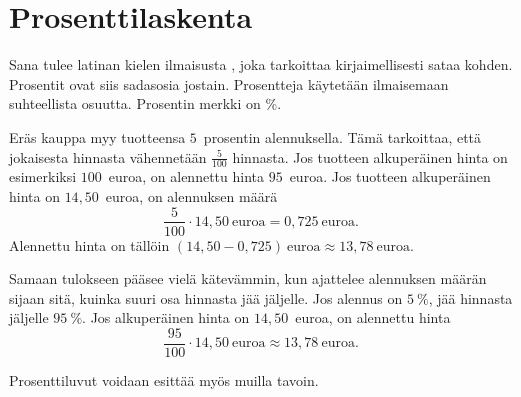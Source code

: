 \section{Prosenttilaskenta}

Sana  tulee latinan kielen ilmaisusta ,
joka tarkoittaa kirjaimellisesti sataa kohden. 
Prosentit ovat siis sadasosia jostain.
Prosentteja käytetään ilmaisemaan suhteellista osuutta.
Prosentin merkki on \%.


\begin{esimerkki}
Eräs kauppa myy tuotteensa $5$~prosentin alennuksella. Tämä tarkoittaa, että jokaisesta hinnasta vähennetään $\frac{5}{100}$ hinnasta. Jos tuotteen alkuperäinen hinta on esimerkiksi $100$~euroa, on alennettu hinta $95$~euroa. Jos tuotteen alkuperäinen hinta on $14,50$~euroa, on alennuksen määrä
\[
	\frac{5}{100} \cdot 14,50~\text{euroa} = 0,725~\text{euroa}.
\]
Alennettu hinta on tällöin $(14,50 - 0,725)~\text{euroa} \approx 13,78~\text{euroa}$.

Samaan tulokseen pääsee vielä kätevämmin, kun ajattelee alennuksen määrän sijaan sitä, kuinka suuri osa hinnasta jää jäljelle. Jos alennus on $5~\%$, jää hinnasta jäljelle $95~\%$. Jos alkuperäinen hinta on $14,50$~euroa, on alennettu hinta 
\[
	\frac{95}{100} \cdot 14,50~\text{euroa} \approx 13,78~\text{euroa}.
\]
\end{esimerkki}

\begin{esimerkki}
    Prosenttiluvut voidaan esittää myös muilla tavoin.
    \begin{alakohdat}
    \end{alakohdat}
\end{esimerkki}


